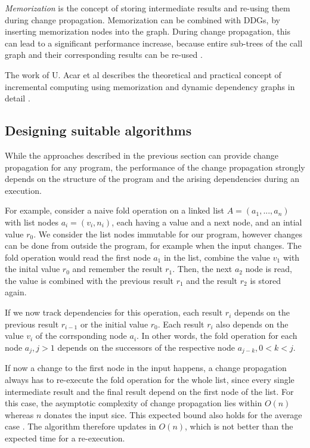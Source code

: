 \textit{Memorization} is the concept of storing intermediate results and re-using them during change propagation. Memorization can be combined with DDGs, by inserting memorization nodes into the graph. During change propagation, this can lead to a significant performance increase, because entire sub-trees of the call graph and their corresponding results can be re-used \cite{Acar2005thesis}.

The work of U. Acar et al describes the theoretical and practical concept of incremental computing using memorization and dynamic dependency graphs in detail \cite{Acar2005thesis}.

\subsection{Designing suitable algorithms}

While the approaches described in the previous section can provide change propagation for any program, the performance of the change propagation strongly depends on the structure of the program and the arising dependencies during an execution. 

For example, consider a naive fold operation on a linked list $A = (a_1, ..., a_n)$ with list nodes $a_i = (v_i, n_i)$, each having a value and a next node, and an intial value $r_0$. We consider the list nodes immutable for our program, however changes can be done from outside the program, for example when the input changes. The fold operation would read the first node $a_1$ in the list, combine the value $v_1$ with the inital value $r_0$ and remember the result $r_1$. Then, the next $a_2$ node is read, the value is combined with the previous result $r_1$ and the result $r_2$ is stored again. 

If we now track dependencies for this operation, each result $r_i$ depends on the previous result $r_{i - 1}$ or the initial value $r_0$. Each result $r_i$ also depends on the value $v_i$ of the corrsponding node $a_i$. In other words, the fold operation for each node $a_j, j > 1$ depends on the successors of the respective node $a_{j - k}, 0 < k < j$.

If now a change to the first node in the input happens, a change propagation always has to re-execute the fold operation for the whole list, since every single intermediate result and the final result depend on the first node of the list. For this case, the asymptotic complexity of change propagation lies within $O(n)$ whereas $n$ donates the input sice. This expected bound also holds for the average case \cite{Acar2005thesis}. The algorithm therefore updates in $O(n)$, which is not better than the expected time for a re-execution. 

